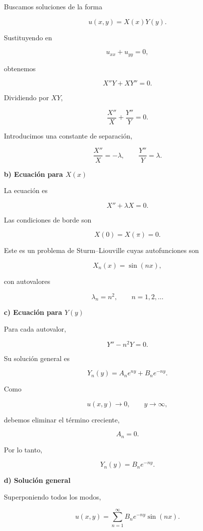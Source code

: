 \documentclass[11pt,spanish]{article}
\newcounter{problema}
\begin{document}
Buscamos soluciones de la forma

\[
u(x,y)=X(x)Y(y).
\]

Sustituyendo en

\[
u_{xx}+u_{yy}=0,
\]

obtenemos

\[
X''Y+XY''=0.
\]

Dividiendo por \(XY\),

\[
\frac{X''}{X}
+
\frac{Y''}{Y}
=0.
\]

Introducimos una constante de separación,

\[
\frac{X''}{X}
=
-\lambda,
\qquad
\frac{Y''}{Y}
=
\lambda.
\]


{\bf b) Ecuación para \(X(x)\)}

La ecuación es

\[
X''+\lambda X=0.
\]

Las condiciones de borde son

\[
X(0)=X(\pi)=0.
\]

Este es un problema de Sturm--Liouville cuyas autofunciones son

\[
X_n(x)=\sin(nx),
\]

con autovalores

\[
\lambda_n=n^2,
\qquad
n=1,2,\ldots
\]


{\bf c) Ecuación para \(Y(y)\)}

Para cada autovalor,

\[
Y''-n^2Y=0.
\]

Su solución general es

\[
Y_n(y)
=
A_ne^{ny}
+
B_ne^{-ny}.
\]

Como

\[
u(x,y)\rightarrow0,
\qquad
y\rightarrow\infty,
\]

debemos eliminar el término creciente,

\[
A_n=0.
\]

Por lo tanto,

\[
Y_n(y)=B_ne^{-ny}.
\]


{\bf d) Solución general}

Superponiendo todos los modos,

\[
u(x,y)
=
\sum_{n=1}^{\infty}
B_n
e^{-ny}
\sin(nx).
\]
\end{document}

